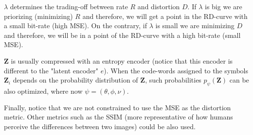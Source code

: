 $\lambda$ determines the trading-off between rate $R$ and distortion
$D$. If $\lambda$ is big we are priorizing (minimizing) $R$ and
therefore, we will get a point in the RD-curve with a small bit-rate
(high MSE). On the contrary, if $\lambda$ is small we are minimizing
$D$ and therefore, we will be in a point of the RD-curve with a high
bit-rate (small MSE).

$\mathbf{Z}$ is usually compressed with an entropy encoder (notice
that this encoder is different to the "latent encoder" $e$). When the
code-words assigned to the symbols $\mathbf{Z}_i$ depends on the
probability distribution of $\mathbf{Z}$, such probabilities
$p_\psi(\mathbf{Z})$ can be also optimized, where now
$\psi=(\theta,\phi, \nu)$.

Finally, notice that we are not constrained to use the MSE as the
distortion metric. Other metrics such as the SSIM (more representative
of how humans perceive the differences between two images) could be
also used.

